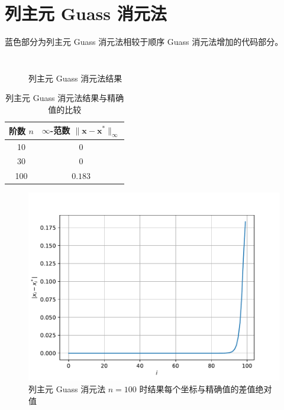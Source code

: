 \documentclass{sjtuarticle}
\begin{document}
\section{列主元 Guass 消元法}

蓝色部分为列主元 Guass 消元法相较于顺序 Guass 消元法增加的代码部分。

\inputminted[firstline=50,lastline=91,highlightlines=60-75]{python3}{main.py}

\begin{minipage}{0.5\textwidth}
    \begin{figure}[H]
        \centering
        \inputminted[firstline=35,lastline=57,fontsize=\tiny]{text}{stdout.txt}
        \caption{列主元 Guass 消元法结果}
    \end{figure}
\end{minipage}
\begin{minipage}{0.45\textwidth}
    \begin{table}[H]
        \centering
        \caption{列主元 Guass 消元法结果与精确值的比较}
        \begin{tabular}{cc}
            \toprule
            阶数 $n$ & $\infty$-范数 $\lVert \bm{x}-\bm{x}^* \rVert_\infty$ \\
            \midrule
            10  & 0      \\
            30  & 0      \\
            100 & $0.183$\\
            \bottomrule
        \end{tabular}
    \end{table}
    \vspace*{-0.75cm}
    \begin{figure}[H]
        \centering
        \includegraphics[width=\textwidth]{pic/PivotGuassSolver.pdf}
        \caption{列主元 Guass 消元法 $n=100$ 时结果每个坐标与精确值的差值绝对值}
    \end{figure}
\end{minipage}
\end{document}
